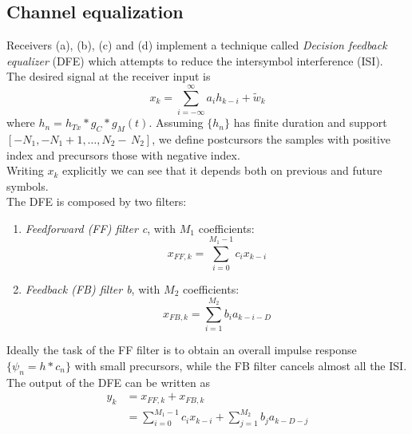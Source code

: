 \documentclass[a4paper, 12pt]{report}
\begin{document}
\subsection*{Channel equalization}
Receivers (a), (b), (c) and (d) implement a technique called \textit{Decision feedback equalizer} (DFE) which attempts to reduce the intersymbol interference (ISI).\\
The desired signal at the receiver input is
\begin{equation*}
x_k = \sum_{i=-\infty}^{\infty} a_i h_{k-i} + \tilde{w}_k
\end{equation*}
where $h_n = h_{Tx}*g_C * g_M(t)$. Assuming $\{h_n\}$ has finite duration and support $[-N_1, -N_1+1, \dots, N_2-\, N_2]$, we define postcursors the samples with positive index and precursors those with negative index.\\
Writing $x_k$ explicitly we can see that it depends both on previous and future symbols.\\
The DFE is composed by two filters:
\begin{enumerate}
	\item \textit{Feedforward (FF) filter c}, with $M_1$ coefficients:
	\begin{equation}
	x_{FF,k} = \sum_{i=0}^{M_1-1}c_ix_{k-i}
	\end{equation}\label{eq:ff_filter}
	\item \textit{Feedback (FB) filter b}, with $M_2$ coefficients:
	\begin{equation}
	x_{FB,k} = \sum_{i=1}^{M_2}b_i a_{k-i-D}
	\end{equation}\label{eq:fb_filter}
\end{enumerate}

Ideally the task of the FF filter is to obtain an overall impulse response $\{\psi_n = h * c_n\}$ with small precursors, while the FB filter cancels almost all the ISI.\\
The output of the DFE can be written as
\begin{equation}
	\begin{split}
	y_k &= x_{FF,k} + x_{FB,k} \\
	&= \sum_{i=0}^{M_1-1}c_ix_{k-i} + \sum_{j=1}^{M_2}b_ja_{k-D-j}
	\end{split} 
\end{equation}
\end{document}
